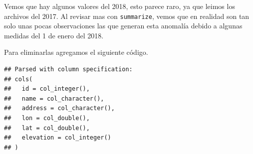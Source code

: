 \documentclass[]{book}
\newenvironment{Shaded}{\begin{snugshade}}{\end{snugshade}}
\newcommand{\DataTypeTok}[1]{\textcolor[rgb]{0.13,0.29,0.53}{#1}}
\newcommand{\DecValTok}[1]{\textcolor[rgb]{0.00,0.00,0.81}{#1}}
\newcommand{\KeywordTok}[1]{\textcolor[rgb]{0.13,0.29,0.53}{\textbf{#1}}}
\newcommand{\NormalTok}[1]{#1}
\newcommand{\OperatorTok}[1]{\textcolor[rgb]{0.81,0.36,0.00}{\textbf{#1}}}
\newcommand{\OtherTok}[1]{\textcolor[rgb]{0.56,0.35,0.01}{#1}}
\newcommand{\StringTok}[1]{\textcolor[rgb]{0.31,0.60,0.02}{#1}}
\begin{document}
Vemos que hay algunos valores del 2018, esto parece raro, ya que leimos
los archivos del 2017. Al revisar mas con \texttt{summarize}, vemos que
en realidad son tan solo unas pocas observaciones las que generan esta
anomalía debido a algunas medidas del 1 de enero del 2018.

Para eliminarlas agregamos el siguiente código.

\begin{Shaded}
\end{Shaded}

\begin{verbatim}
## Parsed with column specification:
## cols(
##   id = col_integer(),
##   name = col_character(),
##   address = col_character(),
##   lon = col_double(),
##   lat = col_double(),
##   elevation = col_integer()
## )
\end{verbatim}

\begin{Shaded}
\end{Shaded}
\end{document}
